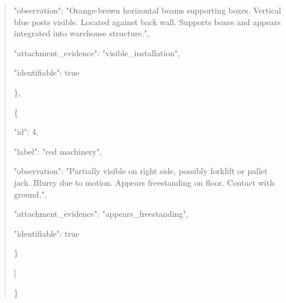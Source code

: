 \documentclass[10pt,a4paper]{article}
\begin{document}
\begin{quote}
      "observation":\allowbreak{} "Orange-brown horizontal beams supporting boxes. Vertical blue posts visible. Located against back wall. Supports boxes and appears integrated into warehouse structure.",\allowbreak{}\par
      "attachment\_evidence":\allowbreak{} "visible\_installation",\allowbreak{}\par
      "identifiable":\allowbreak{} true\par
    \},\allowbreak{}\par
    \{\par
      "id":\allowbreak{} 4,\allowbreak{}\par
      "label":\allowbreak{} "red machinery",\allowbreak{}\par
      "observation":\allowbreak{} "Partially visible on right side,\allowbreak{} possibly forklift or pallet jack. Blurry due to motion. Appears freestanding on floor. Contact with ground.",\allowbreak{}\par
      "attachment\_evidence":\allowbreak{} "appears\_freestanding",\allowbreak{}\par
      "identifiable":\allowbreak{} true\par
    \}\par
  ]\par
\}
\end{quote}
\end{document}
